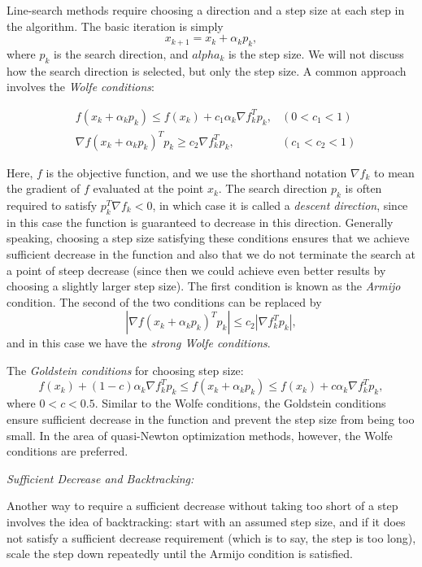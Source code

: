 Line-search methods require choosing a direction and a step size at each step in the 
algorithm. The basic iteration is simply 
\begin{equation*}
x_{k+1} = x_k + \alpha_kp_k,
\end{equation*}
where $p_k$ 
is the search direction, and $alpha_k$ is the step size. We will not discuss how the 
search direction is selected, but only the step size. A common approach involves the 
\emph{Wolfe conditions}:

\begin{align*}
&f(x_k + \alpha_kp_k) \leq f(x_k) + c_1\alpha_k\nabla f_k^Tp_k, &(0 < c_1 < 1)
\\ &\nabla f(x_k + \alpha_kp_k)^Tp_k \geq c_2\nabla f_k^Tp_k, &(c_1 < c_2 < 1)
\end{align*}

Here, $f$ is the objective function, and we use the shorthand notation $\nabla f_k$ to 
mean the gradient of $f$ evaluated at the point $x_k$. The search direction $p_k$ is 
often required to satisfy $p_k^T \nabla f_k < 0$, in which case it is called a 
\emph{descent direction}, since in this case the function is guaranteed to decrease in 
this direction. Generally speaking, choosing a step size satisfying these conditions 
ensures that we achieve sufficient decrease in the function and also that we do not 
terminate the search at a point of steep decrease (since then we could achieve even 
better results by choosing a slightly larger step size). The first condition is known 
as the \emph{Armijo} condition. The second of the two conditions can be replaced by 
\begin{equation*}
| \nabla f(x_k + \alpha_kp_k)^Tp_k| \leq c_2 | \nabla f_k^Tp_k|,
\end{equation*}
and in this case we have the \emph{strong Wolfe conditions}.

The \emph{Goldstein conditions} for choosing step size:
\begin{equation*}
f(x_k) + (1-c)\alpha_k\nabla f_k^Tp_k \leq f(x_k + \alpha_kp_k) \leq f(x_k) + 
c\alpha_k\nabla f_k^Tp_k,
\end{equation*}
where $0 < c < 0.5$. Similar to the Wolfe conditions, the Goldstein conditions ensure 
sufficient decrease in the function and prevent the step size from being too small. In 
the area of quasi-Newton optimization methods, however, the Wolfe conditions are 
preferred.

\emph{Sufficient Decrease and Backtracking:}

Another way to require a sufficient decrease without taking too short of a step 
involves the idea of backtracking: start with an assumed step size, and if it does not 
satisfy a sufficient decrease requirement (which is to say, the step is too long), 
scale the step down repeatedly until the Armijo condition is satisfied.

